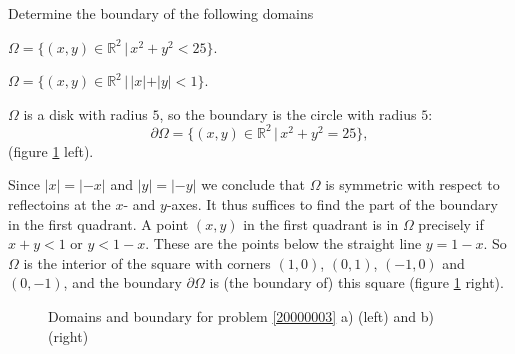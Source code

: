 Determine the boundary of the following domains
\begin{teilaufgaben}
\item
$\Omega=\{(x,y)\in\mathbb R^2\,|\, x^2+y^2<25\}$.
\item
$\Omega=\{(x,y)\in\mathbb R^2\,|\, |x|+|y|<1\}$.
\end{teilaufgaben}

\begin{loesung}
\begin{teilaufgaben}
\item
$\Omega$ is a disk with radius $5$, so the boundary is
the circle with radius $5$:
\[
\partial\Omega=\{(x,y)\in\mathbb R^2\,|\, x^2+y^2=25\},
\]
(figure \ref{20000003:fig} left).
\item
Since $|x|=|-x|$ and $|y|=|-y|$ we conclude that $\Omega$ is symmetric
with respect to reflectoins at the $x$- and $y$-axes.
It thus suffices to find the part of the boundary in the first quadrant.
A point $(x,y)$ in the first quadrant is in $\Omega$ precisely
if $x+y<1$ or $y<1-x$.
These are the points below the straight line $y=1-x$.
So $\Omega$ is the interior of the square with corners
$(1,0)$, $(0,1)$, $(-1,0)$ and $(0,-1)$,
and the boundary $\partial\Omega$ is (the boundary of) this square
(figure \ref{20000003:fig} right).
\qedhere
\end{teilaufgaben}
\begin{figure}
\begin{center}
\end{center}
\caption{Domains and boundary for problem \ref{20000003} a) (left)
and b) (right)\label{20000003:fig}}
\end{figure}
\end{loesung}
